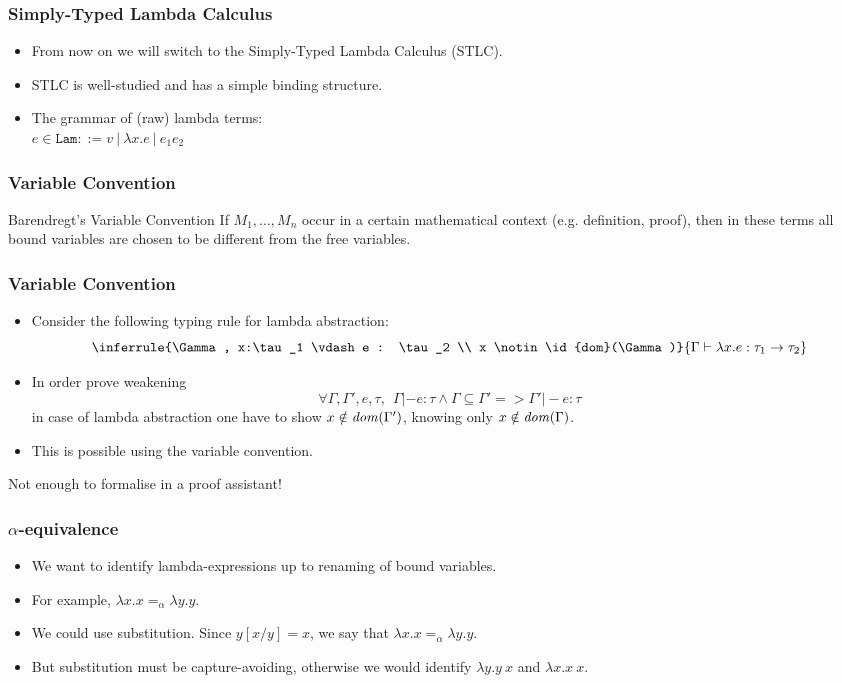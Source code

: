 \documentclass[10pt]{beamer}
\begin{document}
\begin{frame}
  \frametitle{Simply-Typed Lambda Calculus}
  \begin{itemize}
  \item From now on we will switch to the Simply-Typed Lambda Calculus (STLC).
  \item STLC is well-studied and has a simple binding structure.
  \item The grammar of (raw) lambda terms:\\
    $e \in \texttt{Lam}  ::= v ~|~ \lambda x.e ~|~ e_1 e_2$
  \end{itemize}
\end{frame}

\begin{frame}
  \frametitle{Variable Convention}
  \begin{exampleblock}{Barendregt's Variable Convention}
     \large{If $M_1,\dots, M_n$ occur in a certain mathematical context
     (e.g. definition, proof), then in these terms all bound
     variables are chosen to be different from the free variables.}
  \end{exampleblock}
\end{frame}

\begin{frame}
  \frametitle{Variable Convention}
  \begin{itemize}
  \item Consider the following typing rule for lambda abstraction:
    \[ \inferrule{\Gamma, x:\tau_1 \vdash e : \tau_2 \\ x \notin \id{dom}(\Gamma)}
              {\Gamma \vdash \lambda x.e : \tau_1 -> \tau_2} \]
  \item In order prove weakening
    \[\forall \Gamma, \Gamma', e, \tau,~~\Gamma |- e : \tau
    \land \Gamma \subseteq \Gamma' => \Gamma' |- e : \tau\]
  in case of lambda abstraction one have to show
  $x \notin \mathit{dom}(\Gamma')$, knowing only $x \notin \mathit{dom}(\Gamma)$.
\item This is possible using the variable convention.
  \end{itemize}
  \pause
  \centering
  \large{\textcolor{red}{}  Not enough to formalise in a proof assistant!}
\end{frame}

\begin{frame}
  \frametitle{$\alpha$-equivalence}
  \begin{itemize}
  \item We want to identify lambda-expressions up to renaming
    of bound variables.
    \pause
  \item For example, $\lambda x.x =_\alpha \lambda y.y$.
    \pause
  \item We could use substitution. Since $y[x/y] = x$, we say that
    $\lambda x.x =_\alpha \lambda y.y$.
    \pause
  \item But substitution must be capture-avoiding, otherwise we would identify
    $\lambda y.y~x$ and $\lambda x.x~x$.
  \end{itemize}
\end{frame}
\end{document}
